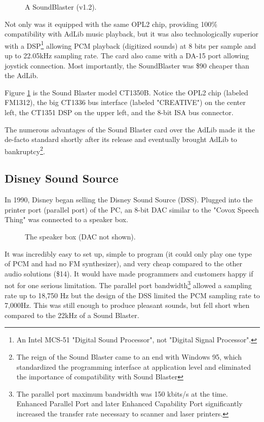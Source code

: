 \documentclass[book.tex]{subfiles}
\begin{document}
\begin{figure}[H] 
  \centering 
  \caption{A SoundBlaster (v1.2). }
  \label{asb12}
\end{figure}
\par
Not only was it equipped with the same OPL2 chip, providing 100\% compatibility with AdLib music playback, but it was also technologically superior with a DSP\footnote{An Intel MCS-51 "Digital Sound Processor", not "Digital Signal Processor".}  allowing PCM playback (digitized sounds) at 8 bits per sample and up to 22.05kHz sampling rate. The card also came with a DA-15 port allowing joystick connection. Most importantly, the SoundBlaster was \$90 cheaper than the AdLib.\\
\par
Figure \ref{asb12} is the Sound Blaster model CT1350B. Notice the OPL2 chip (labeled FM1312), the big CT1336 bus interface (labeled "CREATIVE") on the center left, the CT1351 DSP on the upper left, and the 8-bit ISA bus connector.\\
\par
   The numerous advantages of the Sound Blaster card over the AdLib made it the de-facto standard shortly after its release and eventually brought AdLib to bankruptcy\footnote{The reign of the Sound Blaster came to an end with Windows 95, which standardized the programming interface at application level and eliminated the importance of compatibility with Sound Blaster}.


  \subsection{Disney Sound Source}
  In 1990, Disney began selling the Disney Sound Source (DSS). Plugged into the printer port (parallel port) of the PC, an 8-bit DAC similar to the "Covox Speech Thing" was connected to a speaker box. 
  \par
  \begin{figure}[H] 
    \centering 
    \caption{The speaker box (DAC not shown).}
  \end{figure}
\par
It was incredibly easy to set up, simple to program (it could only play one type of PCM and had no FM synthesizer), and very cheap compared to the other audio solutions (\$14). It would have made programmers and customers happy if not for one serious limitation. The parallel port bandwidth\footnote{The parallel port maximum bandwidth was 150 kbits/s at the time. Enhanced Parallel Port and later Enhanced Capability Port significantly increased the transfer rate necessary to scanner and laser printers.} allowed a sampling rate up to 18,750 Hz but the design of the DSS limited the PCM sampling rate to 7,000Hz. This was still enough to produce pleasant sounds, but fell short when compared to the 22kHz of a Sound Blaster.
  
\end{document}
